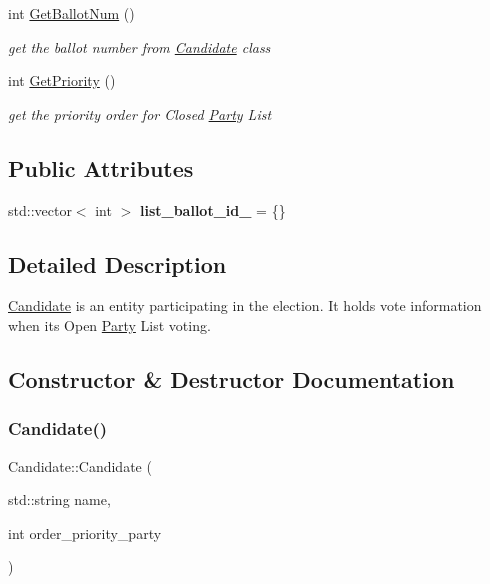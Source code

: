 \begin{DoxyCompactItemize}
int \hyperlink{classCandidate_ab7922ab28b022c85b1a2f9743be4714c}{Get\+Ballot\+Num} ()
\begin{DoxyCompactList}\small\item\em get the ballot number from \hyperlink{classCandidate}{Candidate} class \end{DoxyCompactList}\item 
int \hyperlink{classCandidate_a26abbe93bfda7c101567b3679994e51a}{Get\+Priority} ()
\begin{DoxyCompactList}\small\item\em get the priority order for Closed \hyperlink{classParty}{Party} List \end{DoxyCompactList}\end{DoxyCompactItemize}
\subsection*{Public Attributes}
\begin{DoxyCompactItemize}
\item 
\mbox{\label{classCandidate_a23fc1888995f0ce43ff9414a25e93fc7}} 
std\+::vector$<$ int $>$ {\bfseries list\+\_\+ballot\+\_\+id\+\_\+} = \{\}
\end{DoxyCompactItemize}


\subsection{Detailed Description}
\hyperlink{classCandidate}{Candidate} is an entity participating in the election. It holds vote information when it\textquotesingle{}s Open \hyperlink{classParty}{Party} List voting. 

\subsection{Constructor \& Destructor Documentation}
\mbox{\label{classCandidate_a8d4f237094b44cadffade76995daa553}} 
\subsubsection{\texorpdfstring{Candidate()}{Candidate()}\hspace{0.1cm}{\footnotesize\ttfamily [1/3]}}
{\footnotesize\ttfamily Candidate\+::\+Candidate (\begin{DoxyParamCaption}\item[{std\+::string}]{name,  }\item[{int}]{order\+\_\+priority\+\_\+party }\end{DoxyParamCaption})}



